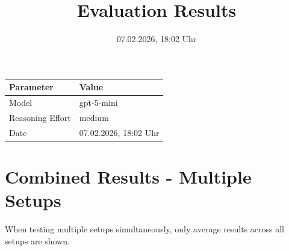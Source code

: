 \documentclass[a4paper,11pt]{article}
\title{Evaluation Results}
\date{07.02.2026, 18:02 Uhr}
\begin{document}
\maketitle

\begin{table}[H]
\centering
\begin{tabular}{l l}
\toprule
\textbf{Parameter} & \textbf{Value} \\
\midrule
Model & gpt-5-mini \\
Reasoning Effort & medium \\
Date & 07.02.2026, 18:02 Uhr \\
\bottomrule
\end{tabular}
\end{table}

\tableofcontents
\clearpage

\section{Combined Results - Multiple Setups}

When testing multiple setups simultaneously, only average results across all setups are shown.
\end{document}
